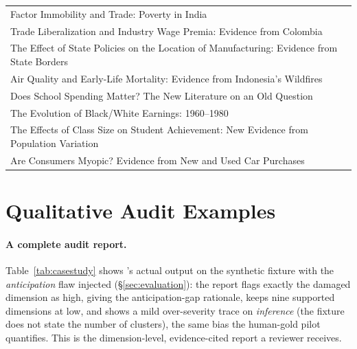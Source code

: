\begin{table}[t]
\begin{tabular}{p{}}
    Factor Immobility and Trade: Poverty in India \\
    Trade Liberalization and Industry Wage Premia: Evidence from Colombia \\
    The Effect of State Policies on the Location of Manufacturing: Evidence from State Borders \\
    Air Quality and Early-Life Mortality: Evidence from Indonesia's Wildfires \\
    Does School Spending Matter? The New Literature on an Old Question \\
    The Evolution of Black/White Earnings: 1960--1980 \\
    The Effects of Class Size on Student Achievement: New Evidence from Population Variation \\
    Are Consumers Myopic? Evidence from New and Used Car Purchases \\
    \bottomrule
  \end{tabular}
\end{table}

\section{Qualitative Audit Examples}
\label{app:qual}

\paragraph{A complete audit report.}
Table~\ref{tab:casestudy} shows \sys{}'s actual output on the synthetic
fixture with the \emph{anticipation} flaw injected (\S\ref{sec:evaluation}): the
report flags exactly the damaged dimension as high, giving the anticipation-gap
rationale, keeps nine supported dimensions at low, and shows a mild
over-severity trace on \emph{inference} (the fixture does not state the number
of clusters), the same bias the human-gold pilot quantifies. This is the
dimension-level, evidence-cited report a reviewer receives.

